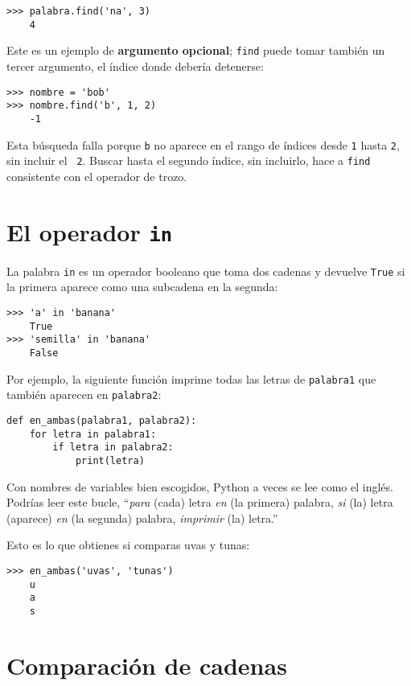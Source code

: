 \documentclass[10pt]{book}
\begin{document}
\begin{verbatim}
>>> palabra.find('na', 3)
    4
\end{verbatim}
%
Este es un ejemplo de {\bf argumento opcional};
{\tt find} puede
tomar también un tercer argumento, el índice donde debería detenerse:

\begin{verbatim}
>>> nombre = 'bob'
>>> nombre.find('b', 1, 2)
    -1
\end{verbatim}
%
Esta búsqueda falla porque {\tt b} no
aparece en el rango de índices desde {\tt 1} hasta {\tt 2}, sin incluir el {\tt
2}.  Buscar hasta el segundo índice, sin incluirlo, hace a
{\tt find} consistente con el operador de trozo.



\section{El operador {\tt in}}
\label{inboth}

La palabra {\tt in} es un operador booleano que toma dos cadenas y
devuelve {\tt True} si la primera aparece como una subcadena en la segunda:

\begin{verbatim}
>>> 'a' in 'banana'
    True
>>> 'semilla' in 'banana'
    False
\end{verbatim}
%
Por ejemplo, la siguiente función imprime todas las
letras de {\tt palabra1} que también aparecen en {\tt palabra2}:

\begin{verbatim}
def en_ambas(palabra1, palabra2):
    for letra in palabra1:
        if letra in palabra2:
            print(letra)
\end{verbatim}
%
Con nombres de variables bien escogidos,
Python a veces se lee como el inglés.  Podrías leer
este bucle, ``{\em para} (cada) letra {\em en} (la primera) palabra, {\em si} (la) letra
(aparece) {\em en} (la segunda) palabra, {\em imprimir} (la) letra.''

Esto es lo que obtienes si comparas uvas y tunas:

\begin{verbatim}
>>> en_ambas('uvas', 'tunas')
    u
    a
    s
\end{verbatim}
%

\section{Comparación de cadenas}
\end{document}
